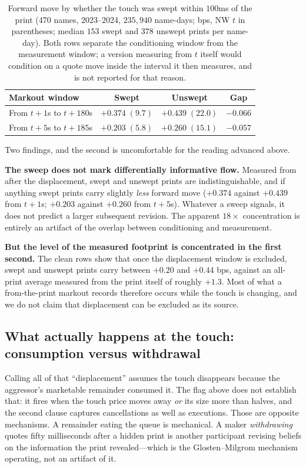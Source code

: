 \documentclass[11pt]{article}
\begin{document}
\begin{table}[htbp]
\centering
\begin{tabular}{lccc}
\toprule
\textbf{Markout window} & \textbf{Swept} & \textbf{Unswept} & \textbf{Gap} \\
\midrule
From $t+1$s to $t+180$s & $+0.374\;(9.7)$ & $+0.439\;(22.0)$ & $-0.066$ \\
From $t+5$s to $t+185$s & $+0.203\;(5.8)$ & $+0.260\;(15.1)$ & $-0.057$ \\
\bottomrule
\end{tabular}
\caption{Forward move by whether the touch was swept within $100$ms of the print (470 names,
2023--2024, $235{,}940$ name-days; bps, NW $t$ in parentheses; median $153$ swept and $378$
unswept prints per name-day). Both rows separate the conditioning window from the measurement
window; a version measuring from $t$ itself would condition on a quote move inside the
interval it then measures, and is not reported for that reason.}
\label{tab:sweep}
\end{table}

Two findings, and the second is uncomfortable for the reading advanced above.

\textbf{The sweep does not mark differentially informative flow.} Measured from after the
displacement, swept and unswept prints are indistinguishable, and if anything swept prints
carry slightly \emph{less} forward move ($+0.374$ against $+0.439$ from $t+1$s; $+0.203$
against $+0.260$ from $t+5$s). Whatever a sweep signals, it does not predict a larger
subsequent revision. The apparent $18\times$ concentration is entirely an artifact of the
overlap between conditioning and measurement.

\textbf{But the level of the measured footprint is concentrated in the first second.} The
clean rows show that once the displacement window is excluded, swept and unswept prints carry
between $+0.20$ and $+0.44$ bps, against an all-print average measured from the print itself
of roughly $+1.3$. Most of what a from-the-print markout records therefore occurs while the
touch is changing, and we do not claim that displacement can be excluded as its source.

\subsection{What actually happens at the touch: consumption versus withdrawal}
\label{sec:consvwdraw}

Calling all of that ``displacement'' assumes the touch disappears because the aggressor's
marketable remainder consumed it. The flag above does not establish that: it fires when the
touch price moves away \emph{or} its size more than halves, and the second clause captures
cancellations as well as executions. Those are opposite mechanisms. A remainder eating the
queue is mechanical. A maker \emph{withdrawing} quotes fifty milliseconds after a hidden
print is another participant revising beliefs on the information the print revealed---which
is the Glosten--Milgrom mechanism operating, not an artifact of it.
\end{document}
